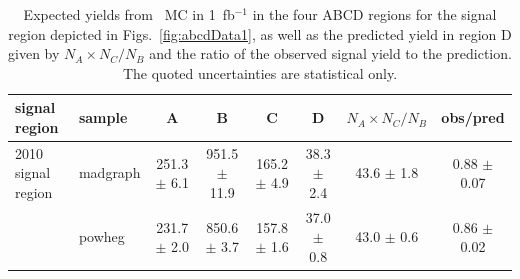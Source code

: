 \begin{table}[hbt]
\begin{center}
\caption{\label{tab:mcabcd} Expected yields from \ttbar\ MC in 1~fb$^{-1}$ in the four
ABCD regions for the signal region depicted in Figs.~\ref{fig:abcdData1},
as well as the predicted yield in region D given by $N _A \times N_C / N_B$ and the ratio of 
the observed signal yield to the prediction. The quoted uncertainties are statistical only.
}
\begin{tabular}{llccccc|c}
\hline
signal region &           sample  &                A  &                B  &                C  &                D  & $N _A \times N_C / N_B$   & obs/pred\\
\hline

\hline

2010 signal region      &   madgraph  & 251.3  $\pm$  6.1  &951.5  $\pm$  11.9  & 165.2  $\pm$  4.9  & 38.3  $\pm$  2.4  & 43.6  $\pm$  1.8  &0.88  $\pm$  0.07 \\
                        &   powheg    & 231.7  $\pm$  2.0  &850.6  $\pm$  3.7   & 157.8  $\pm$  1.6  & 37.0  $\pm$  0.8  & 43.0  $\pm$  0.6  &0.86  $\pm$  0.02 \\

%
%
%
%
\hline
\end{tabular}
\end{center}
\end{table}



